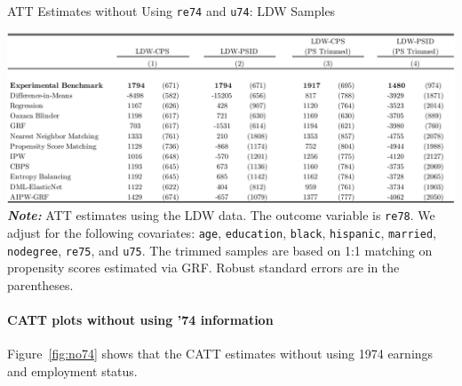 \documentclass[letterpaper,12pt,leqno]{article}
\begin{document}
\begin{table}[!ht]
\caption{ATT Estimates without Using \texttt{re74} and \texttt{u74}: LDW Samples}\label{tb:ldw.no74.est}
\begin{minipage}[c]{1\textwidth}
\vspace{-0.5em}\includegraphics[width=\linewidth]{ldw_no74.pdf}
{\footnotesize\textbf{\textit{Note:}} ATT estimates using the LDW data. The outcome variable is \texttt{re78}. We adjust for the following covariates: \texttt{age}, \texttt{education}, \texttt{black}, \texttt{hispanic}, \texttt{married}, \texttt{nodegree}, \texttt{re75}, and \texttt{u75}. The trimmed samples are based on 1:1 matching on propensity scores estimated via GRF. Robust standard errors are in the parentheses.}
\end{minipage}%
\end{table}

\clearpage

\paragraph{CATT plots without using '74 information} Figure~\ref{fig:no74} shows that the CATT estimates without using 1974 earnings and employment status. 
\end{document}
